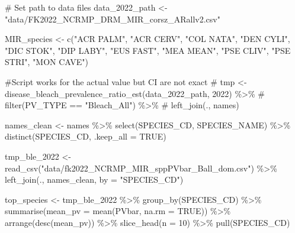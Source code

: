 \documentclass[
]{article}
\newenvironment{Shaded}{\begin{snugshade}}{\end{snugshade}}
\newcommand{\AttributeTok}[1]{\textcolor[rgb]{0.40,0.45,0.13}{#1}}
\newcommand{\CommentTok}[1]{\textcolor[rgb]{0.37,0.37,0.37}{#1}}
\newcommand{\ConstantTok}[1]{\textcolor[rgb]{0.56,0.35,0.01}{#1}}
\newcommand{\DecValTok}[1]{\textcolor[rgb]{0.68,0.00,0.00}{#1}}
\newcommand{\FunctionTok}[1]{\textcolor[rgb]{0.28,0.35,0.67}{#1}}
\newcommand{\NormalTok}[1]{\textcolor[rgb]{0.00,0.23,0.31}{#1}}
\newcommand{\OtherTok}[1]{\textcolor[rgb]{0.00,0.23,0.31}{#1}}
\newcommand{\SpecialCharTok}[1]{\textcolor[rgb]{0.37,0.37,0.37}{#1}}
\newcommand{\StringTok}[1]{\textcolor[rgb]{0.13,0.47,0.30}{#1}}
\begin{document}
\begin{Shaded}
\begin{Highlighting}[]
\CommentTok{\# Set path to data files}
\NormalTok{data\_2022\_path }\OtherTok{\textless{}{-}} \StringTok{"data/FK2022\_NCRMP\_DRM\_MIR\_corsz\_ARallv2.csv"}



\NormalTok{MIR\_species }\OtherTok{\textless{}{-}} \FunctionTok{c}\NormalTok{(}\StringTok{"ACR PALM"}\NormalTok{, }\StringTok{"ACR CERV"}\NormalTok{, }\StringTok{"COL NATA"}\NormalTok{, }\StringTok{"DEN CYLI"}\NormalTok{, }\StringTok{"DIC STOK"}\NormalTok{, }\StringTok{"DIP LABY"}\NormalTok{, }\StringTok{"EUS FAST"}\NormalTok{, }\StringTok{"MEA MEAN"}\NormalTok{, }\StringTok{"PSE CLIV"}\NormalTok{, }\StringTok{"PSE STRI"}\NormalTok{, }\StringTok{"MON CAVE"}\NormalTok{)}

\CommentTok{\#Script works for the actual value but CI are not exact}
\CommentTok{\# tmp \textless{}{-} disease\_bleach\_prevalence\_ratio\_est(data\_2022\_path, 2022) \%\textgreater{}\%}
\CommentTok{\#   filter(PV\_TYPE == "Bleach\_All") \%\textgreater{}\%}
\CommentTok{\#   left\_join(., names)}


\NormalTok{names\_clean }\OtherTok{\textless{}{-}}\NormalTok{ names }\SpecialCharTok{\%\textgreater{}\%}
  \FunctionTok{select}\NormalTok{(SPECIES\_CD, SPECIES\_NAME) }\SpecialCharTok{\%\textgreater{}\%}
  \FunctionTok{distinct}\NormalTok{(SPECIES\_CD, }\AttributeTok{.keep\_all =} \ConstantTok{TRUE}\NormalTok{)}

\NormalTok{tmp\_ble\_2022 }\OtherTok{\textless{}{-}} \FunctionTok{read\_csv}\NormalTok{(}\StringTok{"data/fk2022\_NCRMP\_MIR\_sppPVbar\_Ball\_dom.csv"}\NormalTok{) }\SpecialCharTok{\%\textgreater{}\%}
  \FunctionTok{left\_join}\NormalTok{(., names\_clean, }\AttributeTok{by =} \StringTok{"SPECIES\_CD"}\NormalTok{)}

\NormalTok{top\_species }\OtherTok{\textless{}{-}}\NormalTok{ tmp\_ble\_2022 }\SpecialCharTok{\%\textgreater{}\%}
  \FunctionTok{group\_by}\NormalTok{(SPECIES\_CD) }\SpecialCharTok{\%\textgreater{}\%}
  \FunctionTok{summarise}\NormalTok{(}\AttributeTok{mean\_pv =} \FunctionTok{mean}\NormalTok{(PVbar, }\AttributeTok{na.rm =} \ConstantTok{TRUE}\NormalTok{)) }\SpecialCharTok{\%\textgreater{}\%}
  \FunctionTok{arrange}\NormalTok{(}\FunctionTok{desc}\NormalTok{(mean\_pv)) }\SpecialCharTok{\%\textgreater{}\%}
  \FunctionTok{slice\_head}\NormalTok{(}\AttributeTok{n =} \DecValTok{10}\NormalTok{) }\SpecialCharTok{\%\textgreater{}\%}  
  \FunctionTok{pull}\NormalTok{(SPECIES\_CD)}


\end{Highlighting}
\end{Shaded}
\end{document}
